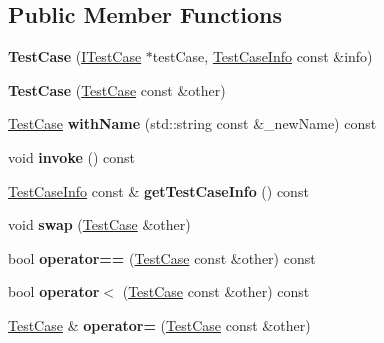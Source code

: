 \subsection*{Public Member Functions}
\begin{DoxyCompactItemize}
\item 
{\bfseries Test\+Case} (\hyperlink{structCatch_1_1ITestCase}{I\+Test\+Case} $\ast$test\+Case, \hyperlink{structCatch_1_1TestCaseInfo}{Test\+Case\+Info} const \&info)\hypertarget{classCatch_1_1TestCase_a03a5b913484681bd6d398dc5e9c2a907}{}\label{classCatch_1_1TestCase_a03a5b913484681bd6d398dc5e9c2a907}

\item 
{\bfseries Test\+Case} (\hyperlink{classCatch_1_1TestCase}{Test\+Case} const \&other)\hypertarget{classCatch_1_1TestCase_ac0011d3789edc3e44edb41f13c4775a0}{}\label{classCatch_1_1TestCase_ac0011d3789edc3e44edb41f13c4775a0}

\item 
\hyperlink{classCatch_1_1TestCase}{Test\+Case} {\bfseries with\+Name} (std\+::string const \&\+\_\+new\+Name) const \hypertarget{classCatch_1_1TestCase_ab6dbc6c82b7c1680013c67bdedccfc8e}{}\label{classCatch_1_1TestCase_ab6dbc6c82b7c1680013c67bdedccfc8e}

\item 
void {\bfseries invoke} () const \hypertarget{classCatch_1_1TestCase_aac2e028135cc88c3e3aac04650960a6c}{}\label{classCatch_1_1TestCase_aac2e028135cc88c3e3aac04650960a6c}

\item 
\hyperlink{structCatch_1_1TestCaseInfo}{Test\+Case\+Info} const \& {\bfseries get\+Test\+Case\+Info} () const \hypertarget{classCatch_1_1TestCase_a25c03661ab092431cdff10df5c58a5a7}{}\label{classCatch_1_1TestCase_a25c03661ab092431cdff10df5c58a5a7}

\item 
void {\bfseries swap} (\hyperlink{classCatch_1_1TestCase}{Test\+Case} \&other)\hypertarget{classCatch_1_1TestCase_aee38f908faf10b905b209ca388275413}{}\label{classCatch_1_1TestCase_aee38f908faf10b905b209ca388275413}

\item 
bool {\bfseries operator==} (\hyperlink{classCatch_1_1TestCase}{Test\+Case} const \&other) const \hypertarget{classCatch_1_1TestCase_a40eab521b316c7d476f6b4dd1c33eec8}{}\label{classCatch_1_1TestCase_a40eab521b316c7d476f6b4dd1c33eec8}

\item 
bool {\bfseries operator$<$} (\hyperlink{classCatch_1_1TestCase}{Test\+Case} const \&other) const \hypertarget{classCatch_1_1TestCase_aa5174e85e3aac6e7398dee9c76730324}{}\label{classCatch_1_1TestCase_aa5174e85e3aac6e7398dee9c76730324}

\item 
\hyperlink{classCatch_1_1TestCase}{Test\+Case} \& {\bfseries operator=} (\hyperlink{classCatch_1_1TestCase}{Test\+Case} const \&other)\hypertarget{classCatch_1_1TestCase_a8022e3f74232f7887d2d2cbbc8876502}{}\label{classCatch_1_1TestCase_a8022e3f74232f7887d2d2cbbc8876502}

\end{DoxyCompactItemize}
